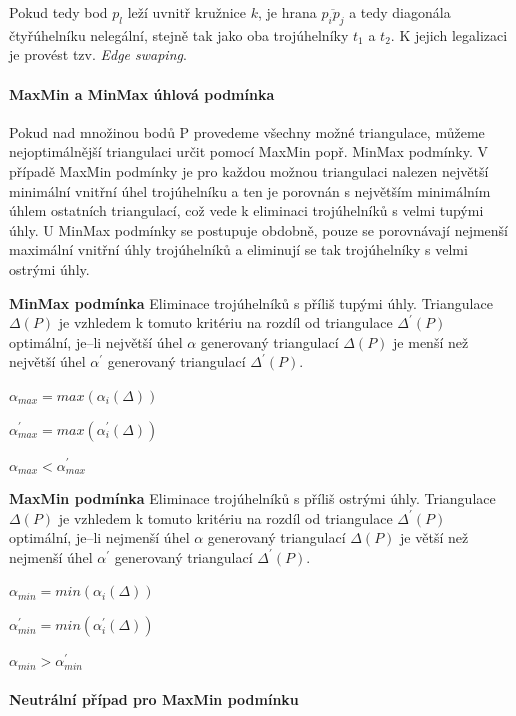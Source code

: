 \documentclass[12pt,a4paper]{article}
\begin{document}
{Pokud tedy bod $p_l$ leží uvnitř kružnice $k$, je hrana
$\overline{p_ip_j}$ a tedy diagonála čtyřúhelníku nelegální, stejně
tak jako oba trojúhelníky $t_1$ a $t_2$. K jejich legalizaci je
provést tzv. \emph{Edge swaping}.

\paragraph{MaxMin a MinMax úhlová podmínka}\cite{TB1}

Pokud nad množinou bodů P provedeme všechny možné triangulace, můžeme
nejoptimálnější triangulaci určit pomocí MaxMin popř. MinMax
podmínky. V případě MaxMin podmínky je pro každou možnou triangulaci
nalezen největší minimální vnitřní úhel trojúhelníku a ten je porovnán
s největším minimálním úhlem ostatních triangulací, což vede k
eliminaci trojúhelníků s velmi tupými úhly. U MinMax podmínky se
postupuje obdobně, pouze se porovnávají nejmenší maximální vnitřní
úhly trojúhelníků a eliminují se tak trojúhelníky s velmi ostrými
úhly.

\newpage
{\bf MinMax podmínka} Eliminace trojúhelníků s příliš tupými
úhly. Triangulace $\Delta(P)$ je vzhledem k tomuto kritériu na rozdíl
od triangulace $\Delta^{'}(P)$ optimální, je–li největší úhel $\alpha$
generovaný triangulací $\Delta(P)$ je menší než největší úhel
$\alpha^{'}$ generovaný triangulací $\Delta^{'}(P)$.
\begin{center}
$\alpha_{max} = max(\alpha_i(\Delta))$

$\alpha^{'}_{max} = max(\alpha_i^{'}(\Delta))$

$\alpha_{max} < \alpha^{'}_{max}$
\end{center}

\bigskip

{\bf MaxMin podmínka} Eliminace trojúhelníků s příliš ostrými
úhly. Triangulace $\Delta(P)$ je vzhledem k tomuto kritériu na rozdíl
od triangulace $\Delta^{'}(P)$ optimální, je–li nejmenší úhel $\alpha$
generovaný triangulací $\Delta(P)$ je větší než nejmenší úhel
$\alpha^{'}$ generovaný triangulací $\Delta^{'}(P)$.
\begin{center}
$\alpha_{min} = min(\alpha_i(\Delta))$

$\alpha^{'}_{min} = min(\alpha_i^{'}(\Delta))$

$\alpha_{min} > \alpha^{'}_{min}$
\end{center}

\paragraph{Neutrální případ pro MaxMin podmínku}

}
\end{document}
